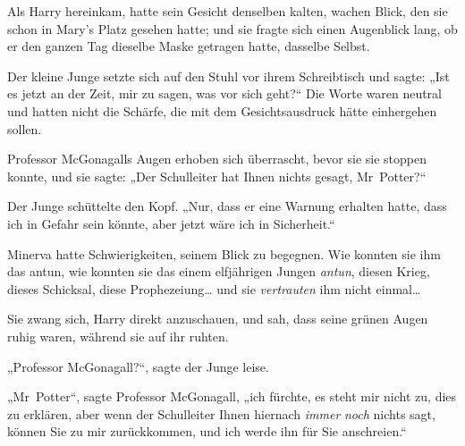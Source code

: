 Als Harry hereinkam, hatte sein Gesicht denselben kalten, wachen Blick, den sie schon in Mary’s Platz gesehen hatte; und sie fragte sich einen Augenblick lang, ob er den ganzen Tag dieselbe Maske getragen hatte, dasselbe Selbst.

Der kleine Junge setzte sich auf den Stuhl vor ihrem Schreibtisch und sagte: „Ist es jetzt an der Zeit, mir zu sagen, was vor sich geht?“ Die Worte waren neutral und hatten nicht die Schärfe, die mit dem Gesichtsausdruck hätte einhergehen sollen.

Professor McGonagalls Augen erhoben sich überrascht, bevor sie sie stoppen konnte, und sie sagte: „Der Schulleiter hat Ihnen nichts gesagt, Mr~Potter?“

Der Junge schüttelte den Kopf. „Nur, dass er eine Warnung erhalten hatte, dass ich in Gefahr sein könnte, aber jetzt wäre ich in Sicherheit.“

Minerva hatte Schwierigkeiten, seinem Blick zu begegnen. Wie konnten sie ihm das antun, wie konnten sie das einem elfjährigen Jungen \emph{antun}, diesen Krieg, dieses Schicksal, diese Prophezeiung… und sie \emph{vertrauten} ihm nicht einmal…

Sie zwang sich, Harry direkt anzuschauen, und sah, dass seine grünen Augen ruhig waren, während sie auf ihr ruhten.

„Professor McGonagall?“, sagte der Junge leise.

„Mr~Potter“, sagte Professor McGonagall, „ich fürchte, es steht mir nicht zu, dies zu erklären, aber wenn der Schulleiter Ihnen hiernach \emph{immer} \emph{noch} nichts sagt, können Sie zu mir zurückkommen, und ich werde ihn für Sie anschreien.“


